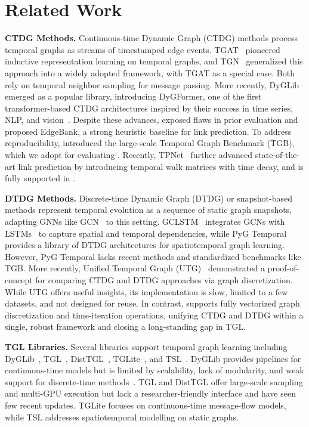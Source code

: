 \section{Related Work}\label{sec:rw}

\textbf{CTDG Methods.}
Continuous-time Dynamic Graph (CTDG) methods process temporal graphs as streams of timestamped edge events. TGAT~\citep{tgat} pioneered inductive representation learning on temporal graphs, and TGN~\citep{tgn} generalized this approach into a widely adopted framework, with TGAT as a special case. Both rely on temporal neighbor sampling for message passing. More recently, DyGLib~\citep{dygfomer} emerged as a popular library, introducing DyGFormer, one of the first transformer-based CTDG architectures inspired by their success in time series, NLP, and vision~\citep{vaswani2017attention,DBLP:conf/naacl/DevlinCLT19,DBLP:conf/iclr/DosovitskiyB0WZ21}. Despite these advances, \citet{edgebank} exposed flaws in prior evaluation and proposed EdgeBank, a strong heuristic baseline for link prediction. To address reproducibility, \citet{huang2023temporal} introduced the large-scale Temporal Graph Benchmark (TGB), which we adopt for evaluating \name. Recently, TPNet~\citep{tpnet} further advanced state-of-the-art link prediction by introducing temporal walk matrices with time decay, and is fully supported in \name.

\textbf{DTDG Methods.}
Discrete-time Dynamic Graph (DTDG) or snapshot-based methods represent temporal evolution as a sequence of static graph snapshots, adapting GNNs like GCN~\citep{gcn} to this setting. GCLSTM~\citep{gclstm} integrates GCNs with LSTMs~\citep{hochreiter1997long} to capture spatial and temporal dependencies, while PyG Temporal~\citep{DBLP:conf/cikm/RozemberczkiSHP21} provides a library of DTDG architectures for spatiotemporal graph learning. However, PyG Temporal lacks recent methods and standardized benchmarks like TGB. More recently, Unified Temporal Graph (UTG)~\citep{utg} demonstrated a proof-of-concept for comparing CTDG and DTDG approaches via graph discretization. While UTG offers useful insights, its implementation is slow, limited to a few datasets, and not designed for reuse. In contrast, \name supports fully vectorized graph discretization and time-iteration operations, unifying CTDG and DTDG within a single, robust framework and closing a long-standing gap in TGL.



\textbf{TGL Libraries.}
Several libraries support temporal graph learning including DyGLib~\citep{yu2023towards}, TGL~\citep{tgl_paper}, DistTGL~\citep{10.1145/3581784.3607056}, TGLite~\citep{10.1145/3620665.3640414}, and TSL~\citep{Cini_Torch_Spatiotemporal_2022}. DyGLib provides pipelines for continuous-time models but is limited by scalability, lack of modularity, and weak support for discrete-time methods~\citep{tgb2}. TGL and DistTGL offer large-scale sampling and multi-GPU execution but lack a researcher-friendly interface and have seen few recent updates. TGLite focuses on continuous-time message-flow models, while TSL addresses spatiotemporal modelling on static graphs. 

